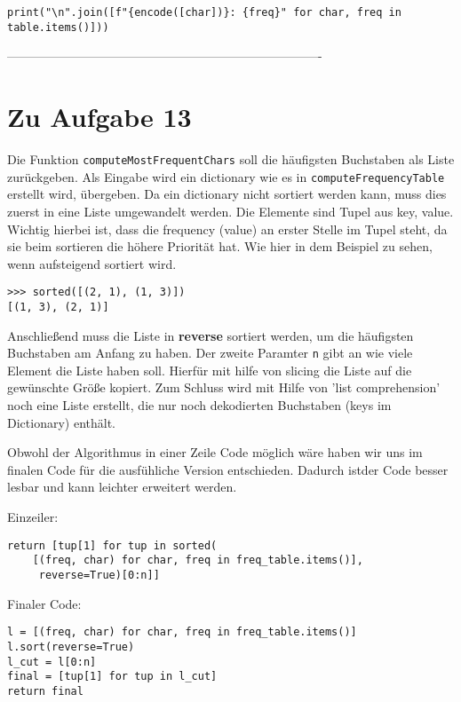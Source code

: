 \documentclass[12pt]{article}
\begin{document}
\begin{lstlisting}
print("\n".join([f"{encode([char])}: {freq}" for char, freq in table.items()]))
\end{lstlisting}

%
 ----------------------------------------------------------------------------
\section{Zu Aufgabe 13}

Die Funktion \texttt{computeMostFrequentChars} soll die häufigsten Buchstaben als Liste zurückgeben. Als Eingabe wird ein dictionary wie es in \texttt{computeFrequencyTable} erstellt wird, übergeben. Da ein dictionary nicht sortiert werden kann, muss dies zuerst in eine Liste umgewandelt werden. Die Elemente sind Tupel aus key, value. Wichtig hierbei ist, dass die frequency (value) an erster Stelle im Tupel steht, da sie beim sortieren die höhere Priorität hat. Wie hier in dem Beispiel zu sehen, wenn aufsteigend sortiert wird.

\begin{lstlisting}
>>> sorted([(2, 1), (1, 3)])
[(1, 3), (2, 1)]     
\end{lstlisting}

Anschließend muss die Liste in \textbf{reverse} sortiert werden, um die häufigsten Buchstaben am Anfang zu haben. Der zweite Paramter \texttt{n} gibt an wie viele Element die Liste haben soll. Hierfür mit hilfe von slicing die Liste auf die gewünschte Größe kopiert. Zum Schluss wird mit Hilfe von 'list comprehension' noch eine Liste erstellt, die nur noch dekodierten Buchstaben (keys im Dictionary) enthält.

Obwohl der Algorithmus in einer Zeile Code möglich wäre haben wir uns im finalen Code für die ausfühliche Version entschieden. Dadurch istder Code besser lesbar und kann leichter erweitert werden. 

Einzeiler:
\begin{lstlisting}
return [tup[1] for tup in sorted(
	[(freq, char) for char, freq in freq_table.items()],
	 reverse=True)[0:n]] 
\end{lstlisting}

Finaler Code:
\begin{lstlisting}
l = [(freq, char) for char, freq in freq_table.items()]
l.sort(reverse=True)
l_cut = l[0:n]
final = [tup[1] for tup in l_cut]
return final   
\end{lstlisting}
 
\end{document}
